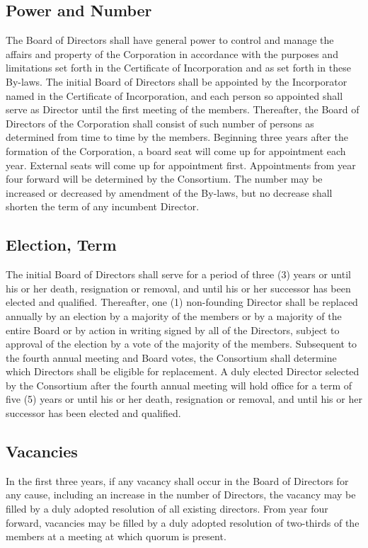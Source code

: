 \documentclass{article}
\begin{document}
\subsection{Power and Number}
The Board of Directors shall have general power to control and manage the affairs and property of the Corporation in accordance with the purposes and limitations set forth in the Certificate of Incorporation and as set forth in these By-laws.  The initial Board of Directors shall be appointed by the Incorporator named in the Certificate of Incorporation, and each person so appointed shall serve as Director until the first meeting of the members.  Thereafter, the Board of Directors of the Corporation shall consist of such number of persons as determined from time to time by the members. Beginning three years after the formation of the Corporation, a board seat will come up for appointment each year. External seats will come up for appointment first. Appointments from year four forward will be determined by the Consortium. The number may be increased or decreased by amendment of the By-laws, but no decrease shall shorten the term of any incumbent Director.
\subsection{Election, Term}
The initial Board of Directors shall serve for a period of three (3) years or until his or her death, resignation or removal, and until his or her successor has been elected and qualified. Thereafter, one (1) non-founding Director shall be replaced annually by an election by a majority of the members or by a majority of the entire Board or by action in writing signed by all of the Directors, subject to approval of the election by a vote of the majority of the members. Subsequent to the fourth annual meeting and Board votes, the Consortium shall determine which Directors shall be eligible for replacement. A duly elected Director selected by the Consortium after the fourth annual meeting will hold office for a term of five (5) years or until his or her death, resignation or removal, and until his or her successor has been elected and qualified.
\subsection{Vacancies}
In the first three years, if any vacancy shall occur in the Board of Directors for any cause, including an increase in the number of Directors, the vacancy may be filled by a duly adopted resolution of all existing directors. From year four forward, vacancies may be filled by a duly adopted resolution of  two-thirds of the members at a meeting at which quorum is present.
\end{document}
